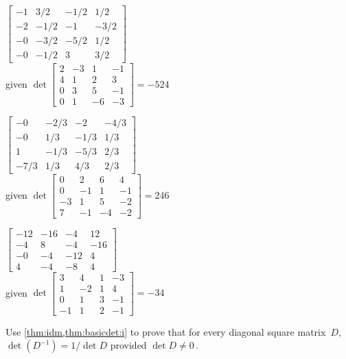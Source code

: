 \begin{exercise}
\begin{Parts}
\item \(\begin{bmatrix} -1&3/2&-1/2&1/2
\\-2&-1/2&-1&-3/2
\\-0&-3/2&-5/2&1/2
\\-0&-1/2&3&3/2 \end{bmatrix}\)
\\given \(\det\begin{bmatrix} 2&-3&1&-1
\\4&1&2&3
\\0&3&5&-1
\\0&1&-6&-3 \end{bmatrix}= -524 \)

\item \(\begin{bmatrix} -0&-2/3&-2&-4/3
\\-0&1/3&-1/3&1/3
\\1&-1/3&-5/3&2/3
\\-7/3&1/3&4/3&2/3 \end{bmatrix}\)
\\given \(\det\begin{bmatrix} 0&2&6&4
\\0&-1&1&-1
\\-3&1&5&-2
\\7&-1&-4&-2 \end{bmatrix}= 246 \)

\begin{OmitV1}
\item \(\begin{bmatrix} -12&-16&-4&12
\\-4&8&-4&-16
\\-0&-4&-12&4
\\4&-4&-8&4 \end{bmatrix}\)
\\given \(\det\begin{bmatrix} 3&4&1&-3
\\1&-2&1&4
\\0&1&3&-1
\\-1&1&2&-1 \end{bmatrix}= -34 \)
\end{OmitV1}

\end{Parts}
\end{exercise}




\begin{exercise} 
Use \cref{thm:idm,thm:basicdet:i} to prove that for every diagonal square matrix~\(D\), \(\det(D^{-1})=1/\det D\) provided \(\det D\neq 0\)\,.
\end{exercise}



